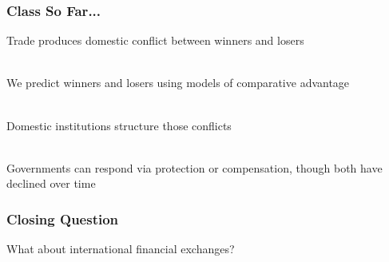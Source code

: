 \documentclass{beamer}
\begin{document}
\begin{frame} 
	\frametitle{\LARGE{Class So Far...}}
	\begin{itemize}
		\large{
			\item Trade produces domestic conflict between winners and losers \pause 
			\\~\\ 
			\item We predict winners and losers using models of comparative advantage \pause  
			\\~\\
			\item Domestic institutions structure those conflicts \pause 
			\\~\\
			\item Governments can respond via protection or compensation, though both have declined over time 
		}
	\end{itemize}
\end{frame}

\begin{frame} 
	\frametitle{\LARGE{Closing Question}}
	\centering
	\Large{What about international financial exchanges?} 
\end{frame}
\end{document}
